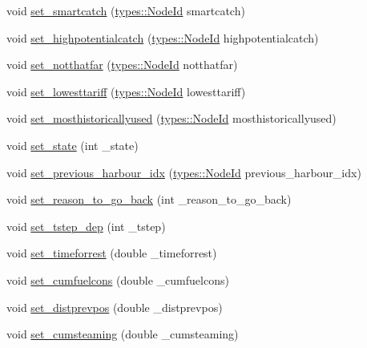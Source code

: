 \begin{DoxyCompactItemize}
\item 
void \mbox{\hyperlink{class_vessel_ab6112ebec0f3b3941b31873639dee2ec}{set\+\_\+smartcatch}} (\mbox{\hyperlink{classtypes_1_1_node_id}{types\+::\+Node\+Id}} smartcatch)
\item 
void \mbox{\hyperlink{class_vessel_aebdc1f709ffe4f34f89a610d1652888e}{set\+\_\+highpotentialcatch}} (\mbox{\hyperlink{classtypes_1_1_node_id}{types\+::\+Node\+Id}} highpotentialcatch)
\item 
void \mbox{\hyperlink{class_vessel_a369c1bfd84a7421ded7f67aeab3143ce}{set\+\_\+notthatfar}} (\mbox{\hyperlink{classtypes_1_1_node_id}{types\+::\+Node\+Id}} notthatfar)
\item 
void \mbox{\hyperlink{class_vessel_a709b8079213a035edbfffc0b1627ef91}{set\+\_\+lowesttariff}} (\mbox{\hyperlink{classtypes_1_1_node_id}{types\+::\+Node\+Id}} lowesttariff)
\item 
void \mbox{\hyperlink{class_vessel_a24c6275217ad49bf868e700773c536a1}{set\+\_\+mosthistoricallyused}} (\mbox{\hyperlink{classtypes_1_1_node_id}{types\+::\+Node\+Id}} mosthistoricallyused)
\item 
void \mbox{\hyperlink{class_vessel_aa32922a76c85f15175c39afb85ddc906}{set\+\_\+state}} (int \+\_\+state)
\item 
void \mbox{\hyperlink{class_vessel_a2cec7d694f826d29ef288a9fb3fea77a}{set\+\_\+previous\+\_\+harbour\+\_\+idx}} (\mbox{\hyperlink{classtypes_1_1_node_id}{types\+::\+Node\+Id}} previous\+\_\+harbour\+\_\+idx)
\item 
void \mbox{\hyperlink{class_vessel_a5fc044160f6defc28286aeab20579c61}{set\+\_\+reason\+\_\+to\+\_\+go\+\_\+back}} (int \+\_\+reason\+\_\+to\+\_\+go\+\_\+back)
\item 
void \mbox{\hyperlink{class_vessel_ad2a12c7d85257e6a0baffb0320a5a91e}{set\+\_\+tstep\+\_\+dep}} (int \+\_\+tstep)
\item 
void \mbox{\hyperlink{class_vessel_ab26a4a58cc3993572734b8dda2fbfa33}{set\+\_\+timeforrest}} (double \+\_\+timeforrest)
\item 
void \mbox{\hyperlink{class_vessel_af1672a9b78c8ca8d931be0f849be6e06}{set\+\_\+cumfuelcons}} (double \+\_\+cumfuelcons)
\item 
void \mbox{\hyperlink{class_vessel_aa22997795c2a383964947bc6d78142b0}{set\+\_\+distprevpos}} (double \+\_\+distprevpos)
\item 
void \mbox{\hyperlink{class_vessel_a7e4d9e9ea0182f0e9c1230e91d421596}{set\+\_\+cumsteaming}} (double \+\_\+cumsteaming)
\item 

\end{DoxyCompactItemize}
